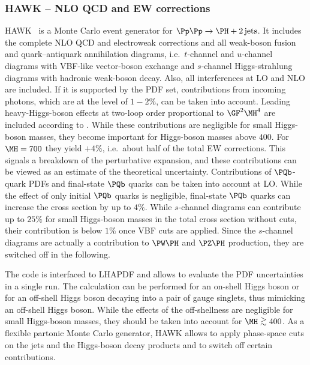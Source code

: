 \subsubsection{HAWK -- NLO QCD and EW corrections}
\label{sec:HAWK}
{\sc HAWK}~\cite{Ciccolini:2007jr,Ciccolini:2007ec,HAWK} is a Monte Carlo
event generator for $\Pp\Pp\to\PH + 2\,\mathrm{jets}$.  It includes the
complete NLO QCD and electroweak corrections and all weak-boson fusion and
quark--antiquark annihilation diagrams, i.e.~$t$-channel and $u$-channel
diagrams with VBF-like vector-boson exchange and $s$-channel Higgs-strahlung
diagrams with hadronic weak-boson decay.  Also, all interferences at LO and
NLO are included. If it is supported by the PDF set, contributions from
incoming photons, which are at the level of $1{-}2\%$, can be taken into
account.  Leading heavy-Higgs-boson effects at two-loop order proportional to
$\GF^2 \MH^4$ are included according to
. While these contributions are
negligible for small Higgs-boson masses, they become important for
Higgs-boson masses above $400$\UGeV.  For $\MH=700$\UGeV{} they yield
$+4\%$, i.e.~about half of the total EW corrections. This signals a breakdown
of the perturbative expansion, and these contributions can be viewed as an
estimate of the theoretical uncertainty.  Contributions of $\PQb$-quark PDFs
and final-state $\PQb$ quarks can be taken into account at LO. While the
effect of only initial $\PQb$ quarks is negligible, final-state $\PQb$ quarks can increase the cross section by up to $4\%$.
While $s$-channel diagrams can contribute up to $25\%$ for small
Higgs-boson masses in the total cross section without cuts, their contribution is below
 $1\%$ once VBF cuts are applied. Since the $s$-channel diagrams are
actually a contribution to $\PW\PH$ and $\PZ\PH$ production, they
are switched off in the following.

The code is interfaced to LHAPDF and allows to evaluate
the PDF uncertainties in a single run.  The calculation can be performed for an
on-shell Higgs boson or for an off-shell Higgs boson decaying into a pair of
gauge singlets, thus mimicking an off-shell Higgs boson. While the effects of
the off-shellness are negligible for small Higgs-boson masses, they should be
taken into account for $\MH \gsim 400$\UGeV. As a flexible partonic Monte
Carlo generator, {\sc HAWK} allows to apply phase-space cuts on the jets and
the Higgs-boson decay products and to switch off certain contributions.


